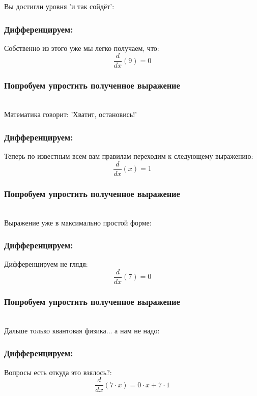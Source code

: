 \documentclass[a4paper,12pt]{article}
\begin{document}
Вы достигли уровня 'и так сойдёт':

\subsubsection*{Дифференцируем:}

Собственно из этого уже мы легко получаем, что:
\begin{dmath}\frac{d}{dx}\left(9\right)=0\end{dmath}
\subsubsection*{Попробуем упростить полученное выражение}
\\Математика говорит: 'Хватит, остановись!'

\subsubsection*{Дифференцируем:}

Теперь по известным всем вам правилам переходим к следующему выражению:
\begin{dmath}\frac{d}{dx}\left(x\right)=1\end{dmath}
\subsubsection*{Попробуем упростить полученное выражение}
\\Выражение уже в максимально простой форме:

\subsubsection*{Дифференцируем:}

Дифференцируем не глядя:
\begin{dmath}\frac{d}{dx}\left(7\right)=0\end{dmath}
\subsubsection*{Попробуем упростить полученное выражение}
\\Дальше только квантовая физика... а нам не надо:

\subsubsection*{Дифференцируем:}

Вопросы есть откуда это взялось?:
\begin{dmath}\frac{d}{dx}\left(7\cdot x\right)=0\cdot x+ 7\cdot 1\end{dmath}
\end{document}
